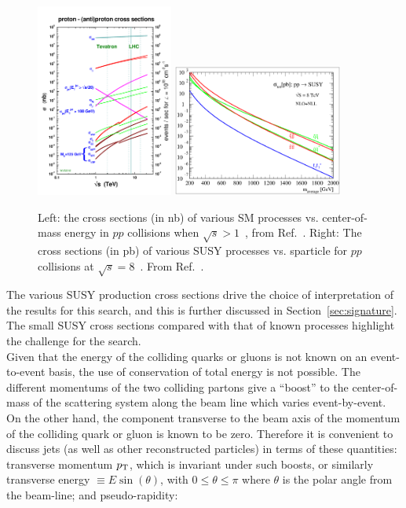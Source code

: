 \begin{figure}[h!]
  \begin{center}
      \includegraphics[width=0.40\textwidth,trim=0 2cm 0 0]{figures/crosssections2012_v5}
      \includegraphics[width=0.5\textwidth, ]{figures/nlonll_lhc8_tpformat.eps}
      \caption{\label{fig:crossSec} Left: the cross sections (in nb) of various SM processes vs. center-of-mass
              energy in $pp$ collisions when $\sqrt{s}>1$~\TeV, from Ref.~\cite{stirling-xs}. Right: 
              The cross sections (in pb) of various SUSY processes vs. sparticle for $pp$ collisions
              at $\sqrt{s}=8$~\TeV. From Ref.~\cite{Beenakker:1996ed}.} 
  \end{center}
\end{figure}

The various SUSY production cross sections drive the choice of interpretation 
of the results for this search, and this is further discussed in Section~\ref{sec:signature}. 
The small SUSY cross sections compared with that of known processes highlight 
the challenge for the search.\\
\indent Given that the energy of the colliding quarks or gluons is not known on 
an event-to-event basis, the use of conservation of total energy is not possible. 
The different momentums of the two colliding partons give a ``boost'' to the center-of-mass 
of the scattering system along the beam line which varies event-by-event. On the other hand, 
the component transverse to the beam axis of the momentum of the colliding quark or gluon is 
known to be zero. Therefore it is convenient to discuss jets (as well as other reconstructed 
particles) in terms of these quantities: transverse momentum $p_{\mathrm{T}}$, which is invariant under 
such boosts, or similarly transverse energy $\equiv E \sin\left(\theta\right)$, with 
$0 \leq \theta \leq \pi$ where $\theta$ is the polar angle from the beam-line; and pseudo-rapidity:

